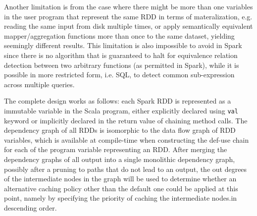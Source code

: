 \documentclass[conference]{sig-alternate-05-2015}
\begin{document}
Another limitation is from the case where there might be more than one variables in the user program that represent the same RDD in terms of materalization, e.g. reading the same input from disk multiple times, or apply semantically equivalent mapper/aggregation functions more than once to the same dataset, yielding seemingly different results. This limitation is also impossible to avoid in Spark since there is no algorithm that is guaranteed to halt for equivalence relation detection between two arbitrary functions (as permitted in Spark), while it is possible in more restricted form, i.e. SQL, to detect common sub-expression across multiple queries.

The complete design works as follows: each Spark RDD is represented as a immutable variable in the Scala program, either explicitly declared using \texttt{val} keyword or implicitly declared in the return value of chaining method calls. The dependency graph of all RDDs is isomorphic to the data flow graph of RDD variables, which is available at compile-time when constructing the def-use chain for each of the program variable representing an RDD. After merging the dependency graphs of all output into a single monolithic dependency graph, possibly after a pruning to paths that do not lead to an output, the out degrees of the intermediate nodes in the graph will be used to determine whether an alternative caching policy other than the default one could be applied at this point, namely by specifying the priority of caching the intermediate nodes.in descending order.
\end{document}

